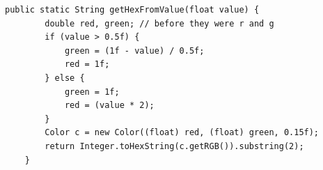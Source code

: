 \documentclass{article}
\begin{document}

\begin{lstlisting}[caption={Fixing naming flaws},captionpos=b]
public static String getHexFromValue(float value) {
        double red, green; // before they were r and g
        if (value > 0.5f) {
            green = (1f - value) / 0.5f;
            red = 1f;
        } else {
            green = 1f;
            red = (value * 2);
        }
        Color c = new Color((float) red, (float) green, 0.15f);
        return Integer.toHexString(c.getRGB()).substring(2);
    }
\end{lstlisting}
\end{document}
